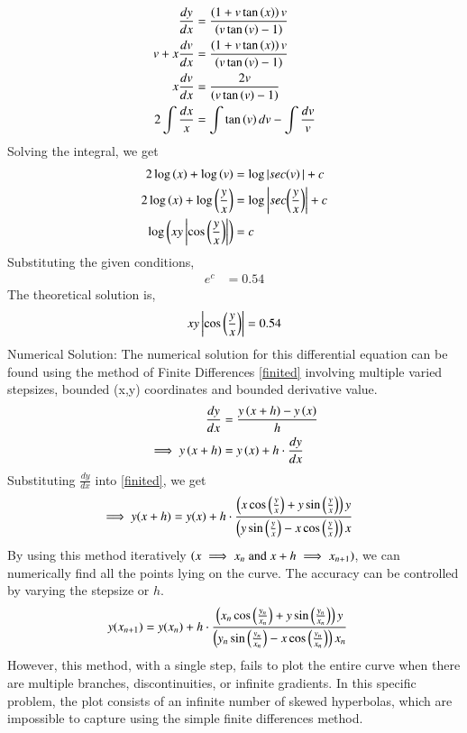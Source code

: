 \documentclass[journal]{IEEEtran}
\begin{document}
	\begin{align}
		\frac{dy}{dx} &= \frac{ \left(1 + v \tan\left(x\right) \right)v}{\left(v \tan\left(v\right) - 1 \right)}\\
		v + x\frac{dv}{dx} &= \frac{ \left(1 + v \tan\left(x\right) \right)v}{\left(v \tan\left(v\right) - 1 \right)}\\
		x\frac{dv}{dx} &= \frac{ 2v}{\left(v \tan\left(v\right) - 1 \right)}\\
		2\int\frac{dx}{x} &=  \int\tan\left(v\right)dv - \int\frac{dv}{v}
	\end{align}
	Solving the integral, we get
	\begin{align}
		2\log\left(x\right) + \log{\ensuremath{\left(v\right)}} &= \log|sec{\left(v\right)|} + c \\
		2\log\left(x\right) + \log{\ensuremath{\left(\frac{y}{x}\right)}} &= \log\left\vert sec{\left(\frac{y}{x}\right)}\right\vert + c \\
		\log{\ensuremath{\left(xy\left\vert\cos\left(\frac{y}{x}\right)\right\vert\right)}} &= c\\
	\end{align}
	Substituting the given conditions,
	\begin{align}
		e^c &= 0.54
	\end{align}
	The theoretical solution is,
	\begin{align}
		xy\left\vert\cos\left(\frac{y}{x}\right)\right\vert &= 0.54\\
	\end{align}
	\newline
	Numerical Solution:\newline
	The numerical solution for this differential equation can be found using the method of Finite Differences \eqref{finited} involving multiple varied stepsizes, bounded (x,y) coordinates and bounded derivative value.
	\begin{align}
		\frac{dy}{dx} &= \frac{y\left(x+h\right) - y\left(x\right)}{h} \\
		\implies y\left(x+h\right) &= y\left(x\right) + h\cdot\frac{dy}{dx} \label{finited}
	\end{align}
	Substituting $\frac{dy}{dx}$ into \eqref{finited}, we get
	\begin{align}
		\implies y(x+h) &= y(x) + h\cdot\frac{ \left(x \cos\left(\frac{y}{x}\right) + y \sin\left(\frac{y}{x}\right) \right)y}{\left(y \sin\left(\frac{y}{x}\right) - x \cos\left(\frac{y}{x}\right) \right)x} 
	\end{align}
	By using this method iteratively $\left(x \implies x_n \text{ and } x+h \implies x_{n+1}\right)$, we can numerically find all the points lying on the curve. The accuracy can be controlled by varying the stepsize or $h$.
	\begin{align}
		y(x_{n+1}) &= y(x_n) + h\cdot\frac{ \left(x_n \cos\left(\frac{y_n}{x_n}\right) + y \sin\left(\frac{y_n}{x_n}\right) \right)y}{\left(y_n \sin\left(\frac{y_n}{x_n}\right) - x \cos\left(\frac{y_n}{x_n}\right) \right)x_n} 
	\end{align}
	However, this method, with a single step, fails to plot the entire curve when there are multiple branches, discontinuities, or infinite gradients. In this specific problem, the plot consists of an infinite number of skewed hyperbolas, which are impossible to capture using the simple finite differences method.  
	
\end{document}
